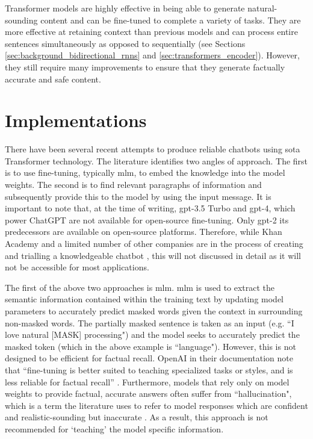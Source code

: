 Transformer models are highly effective in being able to generate natural-sounding content and can be fine-tuned to complete a variety of tasks. They are more effective at retaining context than previous models and can process entire sentences simultaneously as opposed to sequentially (see Sections \ref{sec:background_bidirectional_rnns} and \ref{sec:transformers_encoder}). However, they still require many improvements to ensure that they generate factually accurate and safe content.

\section{Implementations}\label{sec:background_implementations}
There have been several recent attempts to produce reliable chatbots using \acrfull{sota} Transformer technology. The literature identifies two angles of approach. The first is to use fine-tuning, typically \acrfull{mlm}, to embed the knowledge into the model weights. The second is to find relevant paragraphs of information and subsequently provide this to the model by using the input message. It is important to note that, at the time of writing, \acrshort{gpt}-3.5 Turbo and \acrshort{gpt}-4, which power ChatGPT \citep{ChatGPTrelease} are not available for open-source fine-tuning. Only \acrshort{gpt}-2 its predecessors are available on open-source platforms. Therefore, while Khan Academy and a limited number of other companies are in the process of creating and trialling a knowledgeable chatbot \citep{khanAcademy}, this will not discussed in detail as it will not be accessible for most applications. 

The first of the above two approaches is \acrfull{mlm}. \acrshort{mlm} is used to extract the semantic information contained within the training text by updating model parameters to accurately predict masked words given the context in surrounding non-masked words. The partially masked sentence is taken as an input (e.g. ``I love natural [MASK] processing") and the model seeks to accurately predict the masked token (which in the above example is ``language"). However, this is not designed to be efficient for factual recall. OpenAI in their documentation note that ``fine-tuning is better suited to teaching specialized tasks or styles, and is less reliable for factual recall'' \citep{openai_cookbook_qa_embeddings}. Furthermore, models that rely only on model weights to provide factual, accurate answers often suffer from ``hallucination", which is a term the literature uses to refer to model responses which are confident and realistic-sounding but inaccurate \citep{manakul2023selfcheckgpt}. As a result, this approach is not recommended for `teaching' the model specific information.


